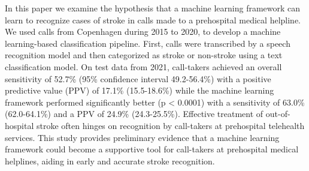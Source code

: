 In this paper we examine the hypothesis that a machine learning framework can learn to recognize cases of stroke in calls made to a prehospital medical helpline. 
We used calls from Copenhagen during 2015 to 2020, to develop a machine learning-based classification pipeline. First, calls were transcribed by a speech recognition model and then categorized as stroke or non-stroke using a text classification model.
On test data from 2021, call-takers achieved an overall sensitivity of 52.7\% (95\% confidence interval 49.2-56.4\%) with a positive predictive value (PPV) of 17.1\% (15.5-18.6\%) while the machine learning framework performed significantly better (p < 0.0001) with a sensitivity of 63.0\% (62.0-64.1\%) and a PPV of 24.9\% (24.3-25.5\%).
Effective treatment of out-of-hospital stroke often hinges on recognition by call-takers at prehospital telehealth services. 
This study provides preliminary evidence that a machine learning framework could become a supportive tool for call-takers at prehospital medical helplines, aiding in early and accurate stroke recognition.
